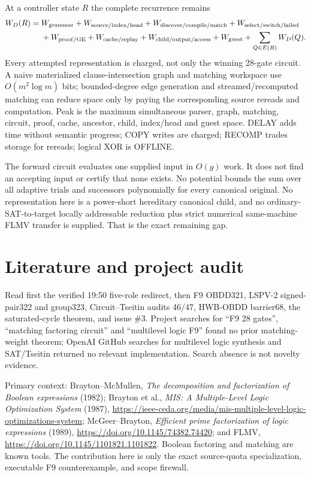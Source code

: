 \documentclass[11pt]{article}
\begin{document}
At a controller state $R$ the complete recurrence remains
\begin{align*}
W_D(R)={}&W_{\rm grammar}+W_{\rm source/index/head}+W_{\rm discover/compile/match}
+W_{\rm select/switch/failed}\\
&+W_{\rm proof/GE}+W_{\rm cache/replay}+W_{\rm child/output/access}
+W_{\rm guest}+\sum_{Q\in E(R)}W_D(Q).
\end{align*}
Every attempted representation is charged, not only the winning 28-gate circuit.  A naive
materialized clause-intersection graph and matching workspace use $O(m^2\log m)$ bits;
bounded-degree edge generation and streamed/recomputed matching can reduce space only by
paying the corresponding source rereads and computation.  Peak is the maximum simultaneous
parser, graph, matching, circuit, proof, cache, ancestor, child, index/head and guest space.
DELAY adds time without semantic progress; COPY writes are charged; RECOMP trades storage for
rereads; logical XOR is OFFLINE.

The forward circuit evaluates one supplied input in $O(g)$ work.  It does not find an
accepting input or certify that none exists.  No potential bounds the sum over all adaptive
trials and successors polynomially for every canonical original.  No representation here is
a power-short hereditary canonical child, and no ordinary-SAT-to-target locally addressable
reduction plus strict numerical same-machine FLMV transfer is supplied.  That is the exact
remaining gap.

\section{Literature and project audit}

Read first the verified 19:50 five-role redirect, then F9 OBDD321, LSPV-2 signed-pair322 and
group323, Circuit--Tseitin audits 46/47, HWB-OBDD barrier68, the saturated-cycle theorem, and
issue \#3.  Project searches for ``F9 28 gates'', ``matching factoring circuit'' and
``multilevel logic F9'' found no prior matching-weight theorem; OpenAI GitHub searches for
multilevel logic synthesis and SAT/Tseitin returned no relevant implementation.  Search
absence is not novelty evidence.

Primary context: Brayton--McMullen, \emph{The decomposition and factorization of Boolean
expressions} (1982); Brayton et al., \emph{MIS: A Multiple-Level Logic Optimization System}
(1987), \url{https://ieee-ceda.org/media/mis-multiple-level-logic-optimizations-system};
McGeer--Brayton, \emph{Efficient prime factorization of logic expressions} (1989),
\url{https://doi.org/10.1145/74382.74420}; and FLMV,
\url{https://doi.org/10.1145/1101821.1101822}.  Boolean factoring and matching are known
tools.  The contribution here is only the exact source-quota specialization, executable F9
counterexample, and scope firewall.
\end{document}
